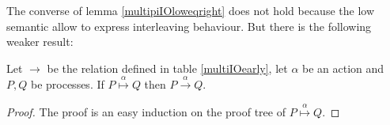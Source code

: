 The converse of lemma \ref{multipiIOloweqright} does not hold because the low semantic allow to express interleaving behaviour. But there is the following weaker result:
\begin{proposition}
  Let $\rightarrow$ be the relation defined in table \ref{multiIOearly}, let $\alpha$ be an action and $P,Q$ be processes. If $P \stackrel{\alpha}{\longmapsto} Q$ then $P\xrightarrow{\alpha} Q$.
  \begin{proof}
    The proof is an easy induction on the proof tree of $P \stackrel{\alpha}{\longmapsto} Q$.
  \end{proof}
\end{proposition}











